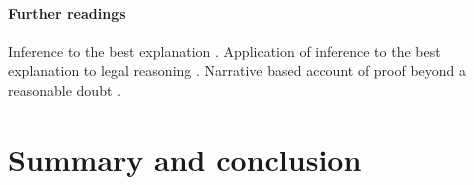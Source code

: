 \documentclass[10pt]{article}
\begin{document}
\paragraph{Further readings}

Inference to the best explanation \citep{lipton1991}.
Application of inference to the best explanation 
to legal reasoning \citep{pardoAllen2008}. 
Narrative based account of proof beyond a 
reasonable doubt \citep{allen2010, allenStein2013}.
















\section{Summary and conclusion}

%
	
%

\end{document}
